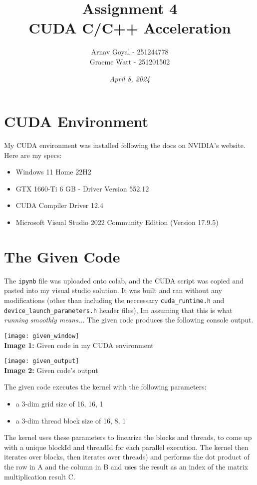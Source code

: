 \documentclass[]{report}
\title{Assignment 4 \\ \textbf{CUDA C/C++ Acceleration}}
\date{\textit{April 8, 2024}}
\author{
	Arnav Goyal - 251244778 \\
	Graeme Watt - 251201502
}
\begin{document}
	
\maketitle

\section*{CUDA Environment}

My CUDA environment was installed following the docs on NVIDIA's website. Here are my specs:
\begin{itemize}
	\item Windows 11 Home 22H2
	\item GTX 1660-Ti 6 GB - Driver Version 552.12
	\item CUDA Compiler Driver 12.4
	\item Microsoft Visual Studio 2022 Community Edition (Version 17.9.5)
\end{itemize}

\section*{The Given Code}

The \texttt{ipynb} file was uploaded onto colab, and the CUDA script was copied and pasted into my visual studio solution. It was built and ran without any modifications (other than including the neccessary \texttt{cuda\_runtime.h} and \texttt{device\_launch\_parameters.h} header files), Im assuming that this is what \textit{running smoothly means...} The given code produces the following console output.

\begin{center}
	\vspace{1em}
	\texttt{[image: given\_window]} \\ \vspace{1em}
	\textbf{Image 1:} Given code in my CUDA environment
	
	\texttt{[image: given\_output]} \\ \vspace{1em}
	\textbf{Image 2:} Given code's output
\end{center}

The given code executes the kernel with the following parameters:
\begin{itemize}
	\item a 3-dim grid size of 16, 16, 1
	\item a 3-dim thread block size of 16, 8, 1
\end{itemize}
The kernel uses these parameters to linearize the blocks and threads, to come up with a unique blockId and threadId for each parallel execution. The kernel then iterates over blocks, then iterates over threads) and performs the dot product of the row in A and the column in B and uses the result as an index of the matrix multiplication result C.
\end{document}
